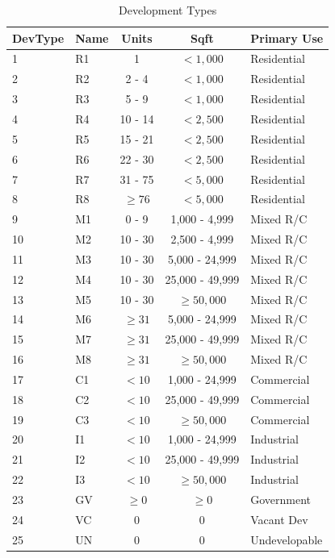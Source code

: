 \documentclass[fleqn]{article}
\begin{document}
\begin{table}[t]
\begin{center}
\begin{tabular}{llccl}
DevType & Name & Units &  Sqft  &  Primary Use  \\ \hline
1 &  R1 & 1       & $< 1,000$ & Residential \\
2 &  R2 & 2 - 4   & $< 1,000$ & Residential \\
3 &  R3 & 5 - 9   & $< 1,000$ & Residential \\
4 &  R4 & 10 - 14 & $< 2,500$ & Residential \\
5 &  R5 & 15 - 21 & $< 2,500$ & Residential \\
6 &  R6 & 22 - 30 & $< 2,500$ & Residential \\
7 &  R7 & 31 - 75 & $< 5,000$ & Residential \\
8 &  R8 & $\geq 76$ & $< 5,000$ & Residential \\
9 &  M1 & 0 - 9   & 1,000 - 4,999 & Mixed R/C \\
10 & M2 & 10 - 30 & 2,500 - 4,999 & Mixed R/C \\
11 & M3 & 10 - 30 & 5,000 - 24,999 & Mixed R/C \\
12 & M4 & 10 - 30 & 25,000 - 49,999 & Mixed R/C \\
13 & M5 & 10 - 30 & $\geq 50,000$ & Mixed R/C \\
14 & M6 & $\geq 31$ & 5,000 - 24,999 & Mixed R/C \\
15 & M7 & $\geq 31$ & 25,000 - 49,999 & Mixed R/C \\
16 & M8 & $\geq 31$ & $\geq 50,000$ & Mixed R/C \\
17 & C1 & $< 10$ & 1,000 - 24,999 & Commercial \\
18 & C2 & $< 10$ & 25,000 - 49,999 & Commercial \\
19 & C3 & $< 10$ & $\geq 50,000$ & Commercial \\
20 & I1 & $< 10$ & 1,000 - 24,999 & Industrial \\
21 & I2 & $< 10$ & 25,000 - 49,999 & Industrial \\
22 & I3 & $< 10$ & $\geq 50,000$ & Industrial \\
23 & GV & $\geq 0$ & $\geq 0$ & Government \\
24 & VC & 0 & 0 & Vacant Dev \\
25 & UN & 0 & 0 & Undevelopable
\end{tabular}
\caption{Development Types}
\label{development-types}
\end{center}
\end{table}
\end{document}

